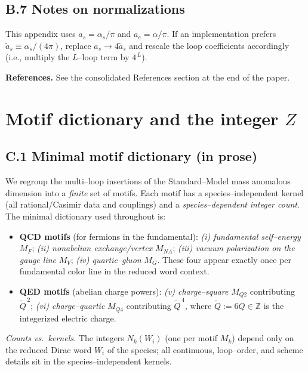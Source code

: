 \documentclass[epjc3]{svjour3}
\begin{document}
\subsection*{B.7 Notes on normalizations}
This appendix uses $a_s=\alpha_s/\pi$ and $a_e=\alpha/\pi$. If an implementation prefers $\tilde a_s\equiv\alpha_s/(4\pi)$, replace $a_s\to 4\tilde a_s$ and rescale the loop coefficients accordingly (i.e., multiply the $L$–loop term by $4^{\,L}$).

\vspace{1ex}
\noindent\textbf{References.} See the consolidated References section at the end of the paper.

\section{Motif dictionary and the integer $Z$}

\subsection*{C.1 Minimal motif dictionary (in prose)}
We regroup the multi–loop insertions of the Standard–Model mass anomalous dimension into a \emph{finite} set of motifs. Each motif has a species–independent kernel (all rational/Casimir data and couplings) and a \emph{species–dependent} \emph{integer count}. The minimal dictionary used throughout is:
\begin{itemize}
  \item \textbf{QCD motifs} (for fermions in the fundamental):
        \emph{(i) fundamental self–energy} $M_F$;
        \emph{(ii) nonabelian exchange/vertex} $M_{NA}$;
        \emph{(iii) vacuum polarization on the gauge line} $M_V$;
        \emph{(iv) quartic–gluon} $M_G$.
        These four appear exactly once per fundamental color line in the reduced word context.
  \item \textbf{QED motifs} (abelian charge powers):
        \emph{(v) charge–square} $M_{Q2}$ contributing $\tilde Q^{\,2}$;
        \emph{(vi) charge–quartic} $M_{Q4}$ contributing $\tilde Q^{\,4}$,
        where $\tilde Q:=6Q\in\mathbb{Z}$ is the integerized electric charge.
\end{itemize}
\emph{Counts vs.\ kernels.} The integers $N_k(W_i)$ (one per motif $M_k$) depend only on the reduced Dirac word $W_i$ of the species; all continuous, loop–order, and scheme details sit in the species–independent kernels.
\end{document}
